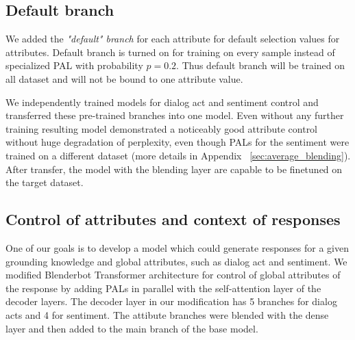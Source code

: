 \documentclass[11pt]{article}
\begin{document}
\subsection{Default branch}
We added the \textit{"default" branch} for each attribute for default selection values for attributes. 
Default branch is turned on for training on every sample instead of specialized PAL with probability $p = 0.2$. Thus default branch will be trained on all dataset and will not be bound to one attribute value.

We independently trained models for dialog act and sentiment control and transferred these pre-trained branches into one model. Even without any further training resulting model demonstrated a noticeably good attribute control without huge degradation of perplexity, even though PALs for the sentiment were trained on a different dataset (more details in Appendix ~\ref{sec:average_blending}). After transfer, the model with the blending layer are capable to be finetuned on the target dataset. 

\subsection{Control of attributes and context of responses}

One of our goals is to develop a model which could generate responses for a given grounding knowledge and global attributes, such as dialog act and sentiment. %
We modified Blenderbot  Transformer architecture for control of global attributes of the response by adding PALs in parallel with the self-attention layer of the decoder layers. The decoder layer in our modification has 5 branches for dialog acts and 4 for sentiment. The attibute branches were blended with the dense layer and then added to the main branch of the base model.
\end{document}
